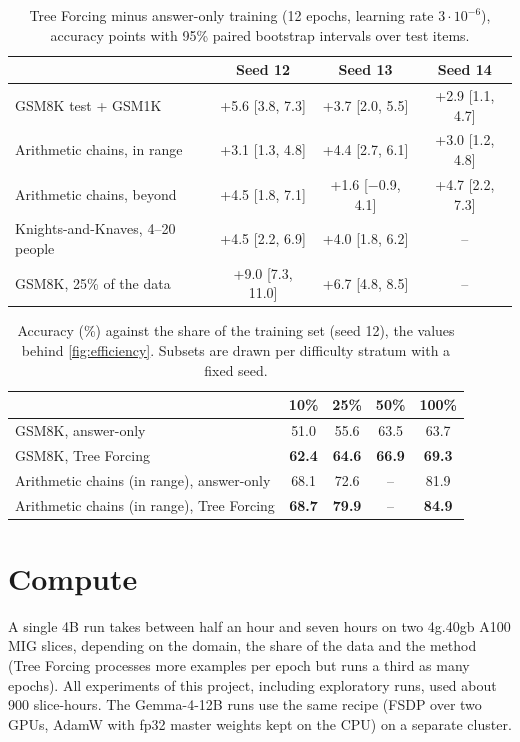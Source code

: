 \documentclass{article}
\newcommand{\tf}{Tree Forcing}
\begin{document}
\begin{table}[h]
\centering
\small
\caption{\tf{} minus answer-only training (12 epochs, learning rate $3\cdot10^{-6}$), accuracy points with 95\%
paired bootstrap intervals over test items.}
\begin{tabular}{lccc}
\toprule
& Seed 12 & Seed 13 & Seed 14 \\
\midrule
GSM8K test + GSM1K & +5.6 [3.8, 7.3] & +3.7 [2.0, 5.5] & +2.9 [1.1, 4.7] \\
Arithmetic chains, in range & +3.1 [1.3, 4.8] & +4.4 [2.7, 6.1] & +3.0 [1.2, 4.8] \\
Arithmetic chains, beyond & +4.5 [1.8, 7.1] & +1.6 [$-$0.9, 4.1] & +4.7 [2.2, 7.3] \\
Knights-and-Knaves, 4--20 people & +4.5 [2.2, 6.9] & +4.0 [1.8, 6.2] & -- \\
\midrule
GSM8K, 25\% of the data & +9.0 [7.3, 11.0] & +6.7 [4.8, 8.5] & -- \\
\bottomrule
\end{tabular}
\end{table}

\begin{table}[h]
\centering
\small
\caption{Accuracy (\%) against the share of the training set (seed 12), the values behind \cref{fig:efficiency}.
Subsets are drawn per difficulty stratum with a fixed seed.}
\label{tab:efficiency}
\begin{tabular}{lcccc}
\toprule
& 10\% & 25\% & 50\% & 100\% \\
\midrule
GSM8K, answer-only & 51.0 & 55.6 & 63.5 & 63.7 \\
GSM8K, \tf{} & \textbf{62.4} & \textbf{64.6} & \textbf{66.9} & \textbf{69.3} \\
Arithmetic chains (in range), answer-only & 68.1 & 72.6 & -- & 81.9 \\
Arithmetic chains (in range), \tf{} & \textbf{68.7} & \textbf{79.9} & -- & \textbf{84.9} \\
\bottomrule
\end{tabular}
\end{table}

\section{Compute}
\label{app:compute}

A single 4B run takes between half an hour and seven hours on two 4g.40gb A100 MIG slices, depending on the domain, the share
of the data and the method (\tf{} processes more examples per epoch but runs a third as many epochs). All experiments
of this project, including exploratory runs, used about 900 slice-hours. The Gemma-4-12B runs use the same recipe
(FSDP over two GPUs, AdamW with fp32 master weights kept on the CPU) on a separate cluster.
\end{document}

